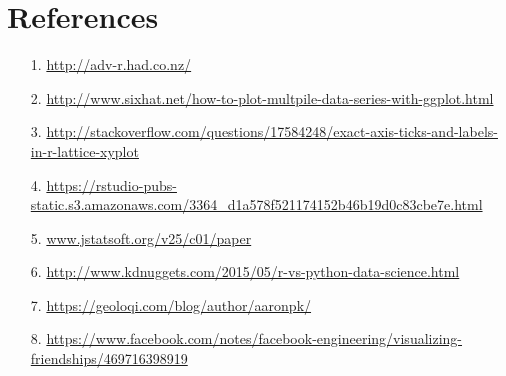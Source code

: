 
\section{References}

\begin{frame}
  \begin{itemize}
    \item[1.] \url{http://adv-r.had.co.nz/}
    \item[2.] \url{http://www.sixhat.net/how-to-plot-multpile-data-series-with-ggplot.html}
    \item[3.] \url{http://stackoverflow.com/questions/17584248/exact-axis-ticks-and-labels-in-r-lattice-xyplot}
    \item[4.] \url{https://rstudio-pubs-static.s3.amazonaws.com/3364_d1a578f521174152b46b19d0c83cbe7e.html}
    \item[5.] \url{www.jstatsoft.org/v25/c01/paper}
    \item[6.] \url{http://www.kdnuggets.com/2015/05/r-vs-python-data-science.html}
    \item[7.] \url{https://geoloqi.com/blog/author/aaronpk/}
    \item[8.] \url{https://www.facebook.com/notes/facebook-engineering/visualizing-friendships/469716398919}
  \end{itemize}
\end{frame}




